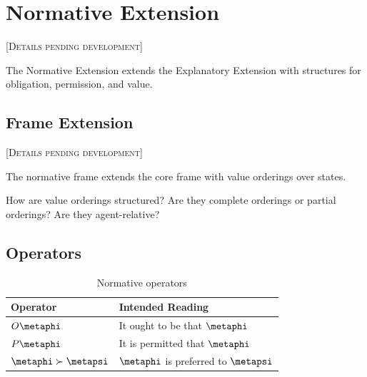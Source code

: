 \documentclass[../LogosReference.tex]{subfiles}
\begin{document}

\section{Normative Extension}\label{sec:normative}

\textsc{[Details pending development]}

The Normative Extension extends the Explanatory Extension with structures for obligation, permission, and value.


\subsection{Frame Extension}\label{sec:normative-frame}

\textsc{[Details pending development]}

The normative frame extends the core frame with value orderings over states.

\begin{question}
How are value orderings structured?
Are they complete orderings or partial orderings?
Are they agent-relative?
\end{question}


\subsection{Operators}\label{sec:normative-operators}

\begin{table}[h]
\centering
\begin{tabular}{ll}
\toprule
\textbf{Operator} & \textbf{Intended Reading} \\
\midrule
$O \metaphi$ & It ought to be that $\metaphi$ \\
$P \metaphi$ & It is permitted that $\metaphi$ \\
$\metaphi \succ \metapsi$ & $\metaphi$ is preferred to $\metapsi$ \\
\bottomrule
\end{tabular}
\caption{Normative operators}
\label{tab:normative-operators}
\end{table}
\end{document}
